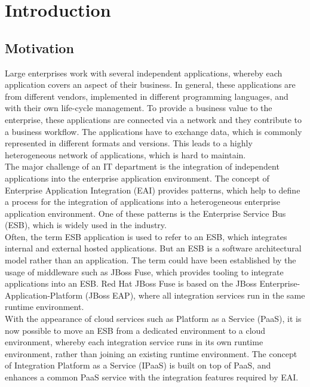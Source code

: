 \chapter{Introduction}
\label{cha:intro}

\section{Motivation}
\label{sec:intro-motivation}
Large enterprises work with several independent applications, whereby each application covers an aspect of their business. In general, these applications are from different vendors, implemented in different programming languages, and with their own life-cycle management. To provide a business value to the enterprise, these applications are connected via a network and they contribute to a business workflow. The applications have to exchange data, which is commonly represented in different formats and versions. This leads to a highly heterogeneous network of applications, which is hard to maintain. \\

The major challenge of an IT department is the integration of independent applications into the enterprise application environment. The concept of Enterprise Application Integration (EAI) provides patterns, which help to define a process for the integration of applications into a heterogeneous enterprise application environment. One of these patterns is the Enterprise Service Bus (ESB), which is widely used in the industry\cite{EIP}. \\

Often, the term ESB application is used to refer to an ESB, which integrates internal and external hosted applications. But an ESB is a software architectural model rather than an application. The term could have been established by the usage of middleware such as JBoss Fuse, which provides tooling to integrate applications into an ESB. Red Hat JBoss Fuse is based on the JBoss Enterprise-Application-Platform (JBoss EAP), where all integration services run in the same runtime environment\cite{Fuse2018}. \\

With the appearance of cloud services such as Platform as a Service (PaaS), it is now possible to move an ESB from a dedicated environment to a cloud environment, whereby each integration service runs in its own runtime environment, rather than joining an existing runtime environment. The concept of Integration Platform as a Service (IPaaS) is built on top of PaaS, and enhances a common PaaS service with the integration features required by EAI\cite{PaaS2015, iPaaSP12015}. \\

